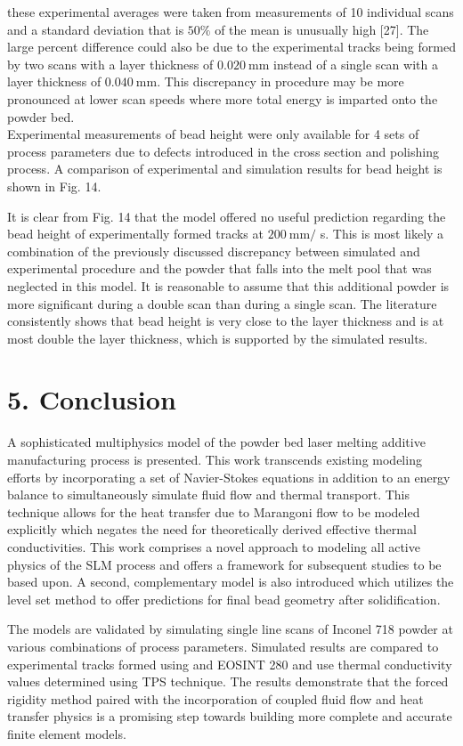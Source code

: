\documentclass[10pt]{article}
\begin{document}
these experimental averages were taken from measurements of 10 individual scans and a standard deviation that is $50 \%$ of the mean is unusually high [27]. The large percent difference could also be due to the experimental tracks being formed by two scans with a layer thickness of $0.020 \mathrm{~mm}$ instead of a single scan with a layer thickness of $0.040 \mathrm{~mm}$. This discrepancy in procedure may be more pronounced at lower scan speeds where more total energy is imparted onto the powder bed.\\
Experimental measurements of bead height were only available for 4 sets of process parameters due to defects introduced in the cross section and polishing process. A comparison of experimental and simulation results for bead height is shown in Fig. 14.

It is clear from Fig. 14 that the model offered no useful prediction regarding the bead height of experimentally formed tracks at $200 \mathrm{~mm} /$ s. This is most likely a combination of the previously discussed discrepancy between simulated and experimental procedure and the powder that falls into the melt pool that was neglected in this model. It is reasonable to assume that this additional powder is more significant during a double scan than during a single scan. The literature consistently shows that bead height is very close to the layer thickness and is at most double the layer thickness, which is supported by the simulated results.

\section*{5. Conclusion}
A sophisticated multiphysics model of the powder bed laser melting additive manufacturing process is presented. This work transcends existing modeling efforts by incorporating a set of Navier-Stokes equations in addition to an energy balance to simultaneously simulate fluid flow and thermal transport. This technique allows for the heat transfer due to Marangoni flow to be modeled explicitly which negates the need for theoretically derived effective thermal conductivities. This work comprises a novel approach to modeling all active physics of the SLM process and offers a framework for subsequent studies to be based upon. A second, complementary model is also introduced which utilizes the level set method to offer predictions for final bead geometry after solidification.

The models are validated by simulating single line scans of Inconel 718 powder at various combinations of process parameters. Simulated results are compared to experimental tracks formed using and EOSINT 280 and use thermal conductivity values determined using TPS technique. The results demonstrate that the forced rigidity method paired with the incorporation of coupled fluid flow and heat transfer physics is a promising step towards building more complete and accurate finite element models.
\end{document}

